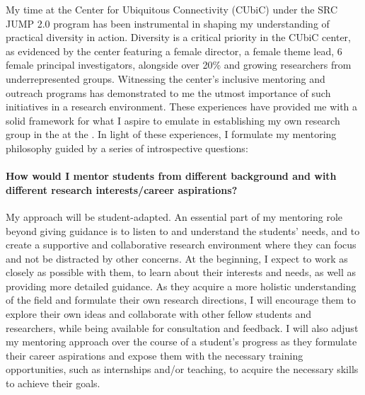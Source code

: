 My time at the Center for Ubiquitous Connectivity (CUbiC) under the SRC JUMP 2.0 program has been instrumental in shaping my understanding of practical diversity in action. Diversity is a critical priority in the CUbiC center, as evidenced by the center featuring a female director, a female theme lead, 6 female principal investigators, alongside over 20\% and growing researchers from underrepresented groups. Witnessing the center's inclusive mentoring and outreach programs has demonstrated to me the utmost importance of such initiatives in a research environment. These experiences have provided me with a solid framework for what I aspire to emulate in establishing my own research group in the \appDept{} at the \appSchool{}. In light of these experiences, I formulate my mentoring philosophy guided by a series of introspective questions:

\paragraph{How would I mentor students from different background and with different research interests/career aspirations?}
My approach will be student-adapted. An essential part of my mentoring role beyond giving guidance is to listen to and understand the students' needs, and to create a supportive and collaborative research environment where they can focus and not be distracted by other concerns. At the beginning, I expect to work as closely as possible with them, to learn about their interests and needs, as well as providing more detailed guidance. As they acquire a more holistic understanding of the field and formulate their own research directions, I will encourage them to explore their own ideas and collaborate with other fellow students and researchers, while being available for consultation and feedback. I will also adjust my mentoring approach over the course of a student's progress as they formulate their career aspirations and expose them with the necessary training opportunities, such as internships and/or teaching,  to acquire the necessary skills to achieve their goals.

